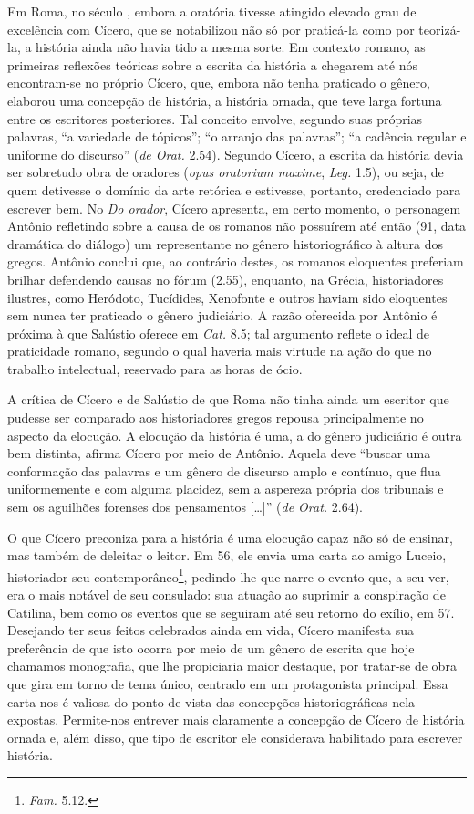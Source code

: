 Em Roma, no século , embora a oratória tivesse atingido elevado grau de
excelência com Cícero, que se notabilizou não só por praticá-la como por
teorizá-la, a história ainda não havia tido a mesma sorte. Em contexto romano,
as primeiras reflexões teóricas sobre a escrita da história a chegarem até nós
encontram-se no próprio Cícero, que, embora não tenha praticado o gênero,
elaborou uma concepção de história, a história ornada, que teve larga
fortuna entre os escritores posteriores. Tal conceito envolve, segundo suas
próprias palavras, “a variedade de tópicos”; “o arranjo das palavras”; “a
cadência regular e uniforme do discurso” (\emph{de Orat.} 2.54). Segundo
Cícero, a escrita da história devia ser sobretudo obra de oradores (\emph{opus
oratorium maxime}, \emph{Leg.} 1.5), ou seja, de quem detivesse o domínio
da arte retórica e estivesse, portanto, credenciado para escrever bem.  No \emph{Do
orador}, Cícero apresenta, em certo momento, o personagem Antônio refletindo
sobre a causa de os romanos não possuírem até então (91, data dramática
do diálogo) um representante no gênero historiográfico à altura dos gregos.
Antônio conclui que, ao contrário destes, os romanos eloquentes preferiam
brilhar defendendo causas no fórum (2.55), enquanto, na Grécia, historiadores
ilustres, como Heródoto, Tucídides, Xenofonte e outros haviam sido  eloquentes
sem nunca ter praticado o gênero judiciário.  A razão oferecida por Antônio é
próxima à que Salústio oferece em \emph{Cat.} 8.5;  tal argumento reflete o ideal de praticidade romano, segundo o qual
haveria mais virtude na ação do que no trabalho intelectual, reservado para as
horas de ócio.  

 A crítica de Cícero e de Salústio de que Roma não tinha ainda um escritor que
 pudesse ser comparado aos historiadores gregos repousa principalmente no aspecto
 da elocução. A elocução da história é uma, a do gênero judiciário é outra bem
 distinta, afirma Cícero por meio de Antônio. Aquela deve ``buscar uma conformação das palavras e um gênero de discurso amplo e contínuo, que flua uniformemente e com alguma placidez, sem a aspereza própria dos tribunais e sem os aguilhões forenses dos pensamentos  [\ldots]” (\emph{de Orat.} 2.64). 
 
O que Cícero preconiza para a história é uma elocução capaz não só de ensinar,
mas também de deleitar o leitor. Em 56, ele envia uma carta ao amigo Luceio,
historiador seu contemporâneo\footnote{\emph{Fam.} 5.12.}, pedindo-lhe que
narre o evento que, a seu ver, era o mais notável de seu consulado: sua atuação
ao suprimir a conspiração de Catilina, bem como os eventos que se seguiram até
seu retorno do exílio, em 57. Desejando ter seus feitos celebrados ainda em
vida, Cícero manifesta sua preferência de que isto ocorra por meio de um gênero
de escrita que hoje chamamos monografia, que lhe propiciaria maior destaque,
por tratar-se de obra que gira em torno de tema único, centrado em um
protagonista principal. Essa carta nos é valiosa do ponto de vista das
concepções historiográficas nela expostas. Permite-nos entrever mais claramente
a concepção de Cícero de história ornada e, além disso, que tipo de escritor
ele considerava habilitado para escrever história. 

